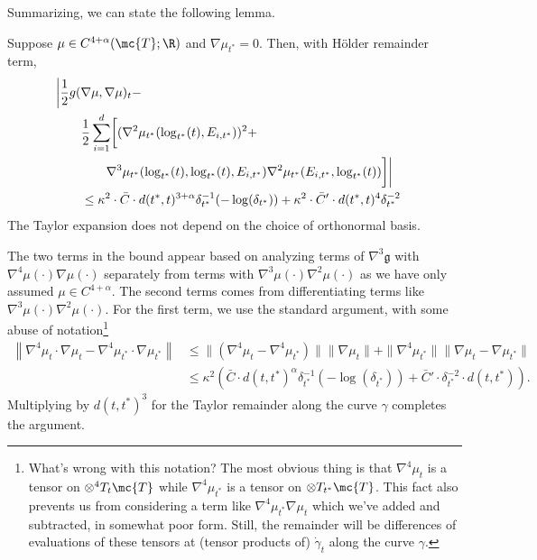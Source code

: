 \documentclass{article}
\begin{document}
Summarizing, we can state the following lemma.
\begin{lemma}
\label{lem:grad:density}
  Suppose $\mu \in C^{4+\alpha}(\mc{T};\R)$ and $\nabla \mu_{t^*}=0$. Then, with H\"older remainder term,
  \begin{equation}
\begin{aligned}
\lefteqn{    \biggl| \frac{1}{2} g(\nabla \mu, \nabla \mu)_t -  } \\
& \qquad  \frac{1}{2}\sum_{i=1}^d \biggl[ (\nabla^2 \mu_{t^*}(\log_{t^*}(t), E_{i,t^*}))^2 + \\
    & \qquad \qquad 
      \nabla^3 \mu_{t^*}(\log_{t^*}(t), \log_{t^*}(t), E_{i,t^*}) \nabla^2 \mu_{t^*}(E_{i,t^*}, \log_{t^*}(t)) \biggr] \biggr| \\
& \qquad \leq \kappa^2 \cdot \bar{C} \cdot d(t^*,t)^{3+\alpha} \delta^{-1}_{t^*}(-\log(\delta_{t^*})) +
\kappa^2 \cdot \bar{C}' \cdot d(t^*,t)^4 \delta_{t^*}^{-2}
\end{aligned}
    \end{equation}
The Taylor expansion does not depend on the choice of orthonormal basis.
  \end{lemma}
The two terms in the bound appear  based on analyzing terms of $\nabla^3 \mathfrak{g}$ with $\nabla^4 \mu(\cdot) \nabla \mu(\cdot)$ separately from
terms with $\nabla^3 \mu(\cdot) \nabla^2 \mu(\cdot)$ as we have only assumed $\mu \in C^{4+\alpha}$. The second
terms comes from differentiating terms like $\nabla^3 \mu(\cdot) \nabla^2 \mu(\cdot)$. For the first term, we use the standard argument, with some abuse of notation\footnote{What's wrong with this notation? The most obvious thing
is that $\nabla^4 \mu_t$ is a tensor on $\otimes^4 T_t\mc{T}$ while $\nabla^4 \mu_{t^*}$ is a tensor
on $\otimes T_{t^*}\mc{T}$. This fact also prevents us from considering a term like $\nabla^4 \mu_{t^*}\nabla \mu_t$ which we've added and subtracted, in somewhat poor form. Still, the remainder will be differences of evaluations of these tensors at (tensor products of) $\dot{\gamma}_t$
along the curve $\gamma$. }
$$
\begin{aligned}
  \left\|\nabla^4 \mu_t \cdot \nabla \mu_t - \nabla^4 \mu_{t^*} \cdot \nabla\mu_{t^*} \right\|
&  \leq \|(\nabla^4\mu_t - \nabla^4 \mu_{t^*})\| \|\nabla \mu_{t}\| +
  \|\nabla^4 \mu_{t^*}\| \|\nabla \mu_t - \nabla \mu_{t^*}\| \\
  & \leq \kappa^2 \left( \bar{C} \cdot d(t,t^*)^{\alpha} \delta_{t^*}^{-1}(-\log(\delta_{t^*})) + \bar{C}' \cdot \delta_{t^*}^{-2} \cdot d(t,t^*) \right).
\end{aligned}
$$
Multiplying by $d(t,t^*)^3$ for the Taylor remainder along the curve $\gamma$ completes the argument.
\end{document}
